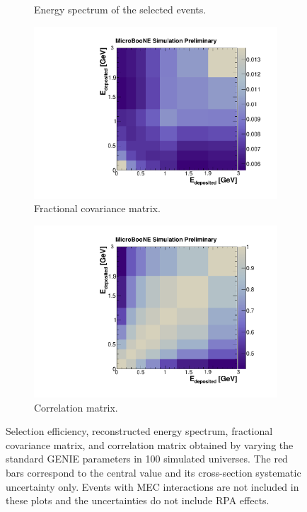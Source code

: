 \begin{figure}[htbp]
\begin{center}
\begin{subfigure}{0.48\textwidth}
      \caption{Energy spectrum of the selected events.}  \label{fig:reco_genie}
    \end{subfigure}
    \begin{subfigure}{0.48\textwidth}
      \includegraphics[width=\linewidth]{figures/frac_genie.pdf}
      \caption{Fractional covariance matrix.}\label{fig:frac_genie}
    \end{subfigure}\hfill
    \begin{subfigure}{0.48\textwidth}
      \includegraphics[width=\linewidth]{figures/corr_genie.pdf}
      \caption{Correlation matrix.}\label{fig:corr_genie}
    \end{subfigure}
    \caption{Selection efficiency, reconstructed energy spectrum, fractional covariance matrix, and correlation matrix obtained by varying the standard GENIE parameters in 100 simulated universes. The red bars correspond to the central value and its cross-section systematic uncertainty only. Events with MEC interactions are not included in these plots and the uncertainties do not include RPA effects.} \label{fig:genie_sys}
	\end{center}
\end{figure}


